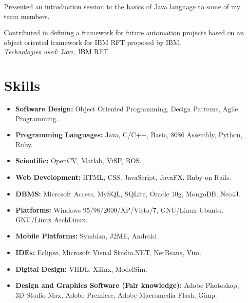 \documentclass{res}
\begin{document}
\begin{resume}
   Presented an introduction session to the basics of Java language to some of my team members.

   Contributed in defining a framework for future automation projects based on an object oriented framework for IBM RFT proposed by IBM.\\
    {\sl Technologies used:} Java, IBM RFT


\section{Skills}
    \begin{itemize}
      \item \textbf{Software Design:} Object Oriented Programming, Design Patterns, Agile Programming.
      \item \textbf{Programming Languages:} Java, C/C++, Basic, 8086 Assembly, Python, Ruby.
      \item \textbf{Scientific:} OpenCV, Matlab, ViSP, ROS.
      \item \textbf{Web Development:} HTML, CSS, JavaScript, JavaFX, Ruby on Rails.
      \item \textbf{DBMS:} Microsoft Access, MySQL, SQLite, Oracle 10g, MongoDB, Neo4J.
      \item \textbf{Platforms:} Windows 95/98/2000/XP/Vista/7, GNU/Linux Ubuntu, GNU/Linux ArchLinux.
      \item \textbf{Mobile Platforms:} Symbian, J2ME, Android.
      \item \textbf{IDEs:} Eclipse, Microsoft Visual Studio.NET, NetBeans, Vim.
      \item \textbf{Digital Design:} VHDL, Xilinx, ModelSim.
      \item \textbf{Design and Graphics Software (Fair knowledge):} Adobe Photoshop, 3D Studio Max, Adobe Premiere, Adobe Macromedia Flash, Gimp.
    \end{itemize}


\end{resume}
\end{document}
